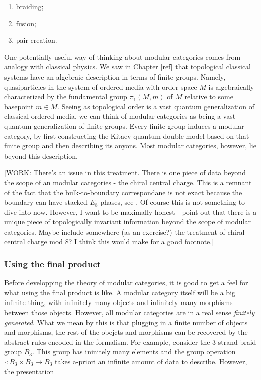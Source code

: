\begin{enumerate}
\item braiding;
\item fusion;
\item pair-creation.
\end{enumerate}

One potentially useful way of thinking about modular categories comes from analogy with classical physics. We saw in Chapter [ref] that topological classical systems have an algebraic description in terms of finite groups. Namely, quasiparticles in the system of ordered media with order space $M$ is algebraically characterized by the fundamental group $\pi_1(M,m)$ of $M$ relative to some basepoint $m\in M$. Seeing as topological order is a vast quantum generalization of classical ordered media, we can think of modular categories as being a vast quantum generalization of finite groups. Every finite group induces a modular category, by first constructing the Kitaev quantum double model based on that finite group and then describing its anyons. Most modular categories, however, lie beyond this description.

[WORK: There's an issue in this treatment. There is one piece of data beyond the scope of an modular categories - the chiral central charge. This is a remnant of the fact that the bulk-to-boundary correspondane is not exact because the boundary can have stacked $E_8$ phases, see \cite{bonderson2021measuring}. Of course this is not something to dive into now. However, I want to be maximally honest - point out that there is a unique piece of topologically invariant information beyond the scope of modular categories. Maybe include somewhere (as an exercise?) the treatment of chiral central charge mod 8? I think this would make for a good footnote.] 

\subsubsection{Using the final product}

Before developping the theory of modular categories, it is good to get a feel for what using the final product is like. A modular category itself will be a big infinite thing, with infinitely many objects and infinitely many morphisms between those objects. However, all modular categories are in a real sense \textit{finitely generated}. What we mean by this is that plugging in a finite number of objects and morphisms, the rest of the obejcts and morphisms can be recovered by the abstract rules encoded in the formalism. For example, consider the 3-strand braid group $B_3$. This group has ininitely many elements and the group operation $\cdot: B_3\times B_3\to B_3$ takes a-priori an infinite amount of data to describe. However, the presentation

